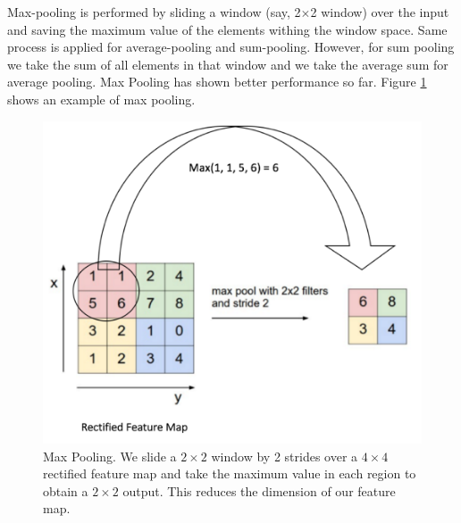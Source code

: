\documentclass[master]{thesis-uestc}
\begin{document}
Max-pooling is performed by sliding a window (say, 2$\times$2 window) over the input and saving the maximum value of the elements withing the window space. Same process is applied for average-pooling and sum-pooling. However, for sum pooling we take the sum of all elements in that window and we take the average sum for average pooling. Max Pooling has shown better performance so far. Figure \ref{fig_maxpooling} shows an example of max pooling.

\begin{figure}[ht]
\includegraphics[width=5in]{pic/pooling.png}
\caption{Max Pooling. We slide a $2 \times 2$ window by 2 strides over a $4 \times 4$ rectified feature map and take the maximum value in each region to obtain a $2 \times 2$ output. This reduces the dimension of our feature map.}
\label{fig_maxpooling}
\end{figure}
\end{document}
